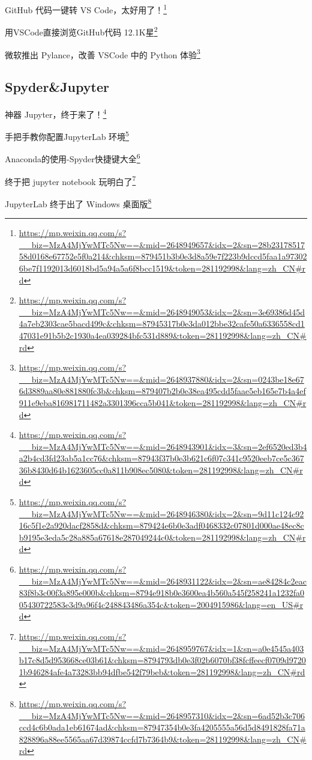 \documentclass[]{ctexbook}
\renewcommand{\href}[2]{#2\footnote{\url{#1}}}
\begin{document}
\href{https://mp.weixin.qq.com/s?__biz=MzA4MjYwMTc5Nw==\&mid=2648949657\&idx=2\&sn=28b2317851758d0168e67752e5f0a214\&chksm=879451b3b0e3d8a59e7f223b9dccd5faa1a973026be7f1192013d6018bd5a94a5a6f8bcc1519\&token=281192998\&lang=zh_CN\#rd}{GitHub 代码一键转 VS Code，太好用了！}

\href{https://mp.weixin.qq.com/s?__biz=MzA4MjYwMTc5Nw==\&mid=2648949053\&idx=2\&sn=3e69386d45d4a7eb2303cae5bacd499c\&chksm=87945317b0e3da012bbe32cafe50a6336558cd147031e91b5b2c1930a4ea039284bfc531d889\&token=281192998\&lang=zh_CN\#rd}{用VSCode直接浏览GitHub代码 \textbar{} 12.1K星}

\href{https://mp.weixin.qq.com/s?__biz=MzA4MjYwMTc5Nw==\&mid=2648937880\&idx=2\&sn=0243be18e676d3889aa80e881880fc3b\&chksm=879407b2b0e38ea495cdd5faae5eb165e7b4a4ef911e9eba816981711482a3301396cca5b041\&token=281192998\&lang=zh_CN\#rd}{微软推出 Pylance，改善 VSCode 中的 Python 体验}

\hypertarget{spyderjupyter}{%
\subsection{Spyder\&Jupyter}\label{spyderjupyter}}

\href{https://mp.weixin.qq.com/s?__biz=MzA4MjYwMTc5Nw==\&mid=2648943901\&idx=3\&sn=2ef6520ed3b4a2b4cd3fd23ab5a1cc76\&chksm=87943f37b0e3b621c6f07c341c9520eeb7ce5c36736b8430d64b1623605cc0a811b908ec5080\&token=281192998\&lang=zh_CN\#rd}{神器 Jupyter，终于来了！}

\href{https://mp.weixin.qq.com/s?__biz=MzA4MjYwMTc5Nw==\&mid=2648946380\&idx=2\&sn=9d11c124c9216c5f1e2a920dacf2858d\&chksm=879424e6b0e3adf0468332c07801d000ae48ec8cb9195e3eda5c28a885a67618e287049244c0\&token=281192998\&lang=zh_CN\#rd}{手把手教你配置JupyterLab 环境}

\href{https://mp.weixin.qq.com/s?__biz=MzA4MjYwMTc5Nw==\&mid=2648931122\&idx=2\&sn=ae84284c2eac83f8b3c00f3a895e000b\&chksm=8794e918b0e3600ea4b560a545f258241a1232fa005430722583e3d9a96f4c248843486a354c\&token=2004915986\&lang=en_US\#rd}{Anaconda的使用-Spyder快捷键大全}

\href{https://mp.weixin.qq.com/s?__biz=MzA4MjYwMTc5Nw==\&mid=2648959767\&idx=1\&sn=a0e4545a403b17c8d5d953668ce03b61\&chksm=8794793db0e3f02b6070bf38fcffeecf0709d97201b946284afe4a73283bb94dfbe542f79beb\&token=281192998\&lang=zh_CN\#rd}{终于把 jupyter notebook 玩明白了}

\href{https://mp.weixin.qq.com/s?__biz=MzA4MjYwMTc5Nw==\&mid=2648957310\&idx=2\&sn=6ad52b3c706ccd4c6b0ada1eb61674ad\&chksm=87947354b0e3fa4205555a56d5d8491828fa71a828896a88ee5565aa67d39874ccfd7b7364b9\&token=281192998\&lang=zh_CN\#rd}{JupyterLab 终于出了 Windows 桌面版}
\end{document}
